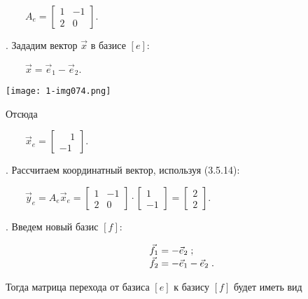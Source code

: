 \documentclass[a4paper]{article}
\begin{document}
{\begin{russian}\sffamily
\ \ \ \  $A_e=\left[\begin{matrix}1&-1\\2&0\end{matrix}\right]$.
\end{russian}}

{\begin{russian}. Зададим вектор  $\vec x$ в базисе  $[e]$:
\end{russian}}

{\begin{russian}\sffamily
\ \ \ \  $\vec x=\vec e_1-\vec e_2$.
\end{russian}}

{\centering  \texttt{[image: 1-img074.png]} \par}

\bigskip

{\begin{russian}\sffamily
Отсюда
\end{russian}}

{\begin{russian}\sffamily
\ \ \ \  $\vec x_e=\left[\begin{matrix}\;\;\;\;1\\-1\end{matrix}\right]$.
\end{russian}}

{\begin{russian}. Рассчитаем координатный вектор, используя (3.5.14):
\end{russian}}

{\begin{russian}\sffamily
\ \ \ \  $\vec y_e=A_e\vec x_e=\left[\begin{matrix}1&-1\\2&0\end{matrix}\right]\cdot
\left[\begin{matrix}1\\-1\end{matrix}\right]=\left[\begin{matrix}2\\2\end{matrix}\right]$.
\end{russian}}

{\begin{russian}. Введем новый базис  $[f]$:
\end{russian}}

\begin{equation*}
\begin{matrix}\vec f_1=-\vec e_2\;;\hfill\null \\\vec f_2=-\vec e_1-\vec e_2\;.\hfill\null \end{matrix}\hfill 
\end{equation*}
{\begin{russian}\sffamily
Тогда матрица перехода от базиса  $[e]$\textit{ }к базису  $[f]$ будет иметь вид
\end{russian}}
\end{document}

